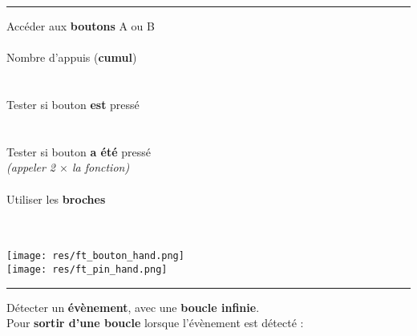 \begin{minipage}{0.72\linewidth}
\begin{methode}
	\rule{-0.25em}{2em}
	Accéder aux \textbf{boutons} A ou B
	\hfill {}\\
	~\hfill {}\\

	Nombre d'appuis (\textbf{cumul})
	\hfill {}\\
	\hfill {}\\
	\hfill \ex {}\\
	
	Tester si bouton \textbf{est} pressé
	\hfill {}\\
	\hfill {}\\
	\hfill \ex {}\\
	
	Tester si bouton \textbf{a été} pressé
	\hfill {}\\
	\textit{\footnotesize (appeler 2 $\times$ la fonction)}
	\hfill {}\\
	\hfill \ex {}\\
	
	Utiliser les \textbf{broches}
	\hfill {}\\
	\hfill {}\\
	\hfill {}\\
	
\end{methode}
\end{minipage}
\hfill
\begin{minipage}{0.28\linewidth}
	\begin{center}
		\texttt{[image: res/ft\_bouton\_hand.png]}\\[2em]
		\texttt{[image: res/ft\_pin\_hand.png]}
	\end{center}
\end{minipage}

\begin{remarque}
	\rule{-0.25em}{1.7em}
	Détecter un \textbf{évènement}, avec une \textbf{boucle infinie}.
	\hfill	\ex {}\\
	
	Pour \textbf{sortir d'une boucle} lorsque l'évènement est détecté :
	\hfill \ex {}\\
\end{remarque}

